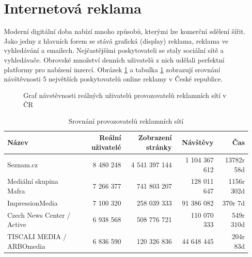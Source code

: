 \section{Internetová reklama}\label{sec:online-ad}
Moderní digitální doba nabízí mnoho způsobů, kterými lze komerční sdělení šířit. Jako jedny z hlavních forem se stává grafická (display) reklama,
reklama ve vyhledávání a emailech. Nejčastějšími poskytovateli se staly sociální sítě a vyhledávače.
Obrovské množství denních uživatelů z nich udělali perfektní platformy pro nabízení inzercí.
Obrázek \ref{fig:spir-publishers} a tabulka \ref{tab:spir-publishers} zobrazují srovnání návštěvnosti 5 největších poskytovatelů online reklamy v České republice.

\begin{figure}[h]
    \centering
    \caption[Graf návštěvosti provozovatelů reklamních sítí]{Graf návstěvnosti reálných uživatelů provozovatelů reklamních sítí v ČR \cite{gemius:rating}}
    \label{fig:spir-publishers}
    
\end{figure}

\begin{table}[hb]
    \centering
    \caption[Srovnání provozovatelů reklamních sítí]{Srovnání provozovatelů reklamních sítí \cite{gemius:rating}}
	\label{tab:spir-publishers}
    \begin{tabular}{l|r|r|r|r}
        \toprule
            Název & Reální uživatelé & Zobrazení stránky & Návštěvy & Čas \\
        \midrule
            Seznam.cz & 8 480 248 & 4 541 397 144  & 1 104 367 612 & 13782r 58d  \\
            Mediální skupina Mafra & 7 266 377 & 741 803 207  & 128 011 647  & 1156r 302d \\
            ImpressionMedia & 7 100 320  & 258 039 333 & 91 386 082 & 370r 7d  \\
            Czech News Center / Active & 6 938 568 & 508 776 721 & 110 070 333  & 549r 310d  \\
            TISCALI MEDIA / ARBOmedia & 6 836 590 & 120 326 836  & 44 648 445 & 204r 83d  \\
        \midrule
        
    \end{tabular}
\end{table}


